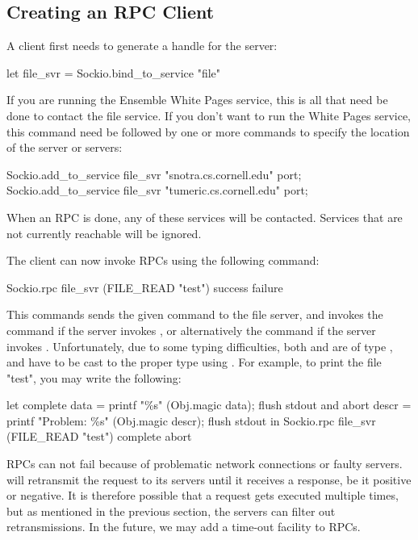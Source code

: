 \subsection{Creating an RPC Client}

A client first needs to generate a handle for the server:
\begin{codebox}
   let file_svr = Sockio.bind_to_service "file"
\end{codebox}

If you are running the Ensemble White Pages service, this is all that need be done to
contact the file service.  If you don't want to run the White Pages service, this
command need be followed by one or more commands to specify the location of the
server or servers:
\begin{codebox}
   Sockio.add_to_service file_svr "snotra.cs.cornell.edu" port;
   Sockio.add_to_service file_svr "tumeric.cs.cornell.edu" port;
\end{codebox}

When an RPC is done, any of these services will be contacted.  Services that are not
currently reachable will be ignored.

The client can now invoke RPCs using the following command:
\begin{codebox}
  Sockio.rpc file_svr (FILE_READ "test") success failure
\end{codebox}

This commands sends the given command to the file server, and invokes the command
 if the server invokes , or
alternatively the command  if the server invokes
.  Unfortunately, due to some typing difficulties,
both  and  are of type , and have to be
cast to the proper type using .  For example, to print the file
"test", you may write the following:
\begin{codebox}
  let complete data =
    printf "\%s" (Obj.magic data); flush stdout
  and abort descr =
    printf "Problem: \%s" (Obj.magic descr); flush stdout
  in
  Sockio.rpc file_svr (FILE_READ "test") complete abort
\end{codebox}

RPCs can not fail because of problematic network connections or faulty servers.
 will retransmit the request to its servers until it receives a
response, be it positive or negative.  It is therefore possible that a request gets
executed multiple times, but as mentioned in the previous section, the servers can
filter out retransmissions.  In the future, we may add a time-out facility to RPCs.

